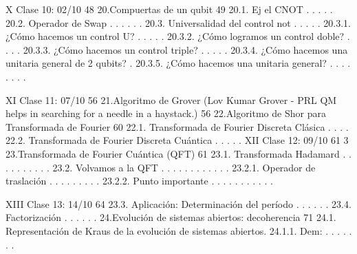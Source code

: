X Clase 10: 02/10 48
20.Compuertas de un qubit 49
20.1. Ej el CNOT . . . . .
20.2. Operador de Swap . . . . . .
20.3. Universalidad del control not . . . . .
20.3.1. ¿Cómo hacemos un control U? . . . . . 
20.3.2. ¿Cómo logramos un control doble? . . . . 
20.3.3. ¿Cómo hacemos un control triple? . . . . . 
20.3.4. ¿Cómo hacemos una unitaria general de 2 qubits? . 
20.3.5. ¿Cómo hacemos una unitaria general? . . . . . . . .

XI Clase 11: 07/10 56
21.Algoritmo de Grover (Lov Kumar Grover - PRL QM helps in searching for a needle in a haystack.) 56
22.Algoritmo de Shor para Transformada de Fourier 60
22.1. Transformada de Fourier Discreta Clásica . . . .
22.2. Transformada de Fourier Discreta Cuántica . . . . . 
XII Clase 12: 09/10 61
3
23.Transformada de Fourier Cuántica (QFT) 61
23.1. Transformada Hadamard . . . . . . . . . .
23.2. Volvamos a la QFT . . . . . . . . . . . .
23.2.1. Operador de traslación . . . . . . . . .
23.2.2. Punto importante . . . . . . . . . . . 

XIII Clase 13: 14/10 64
23.3. Aplicación: Determinación del período . . . . . . 
23.4. Factorización . . . . . .
24.Evolución de sistemas abiertos: decoherencia 71
24.1. Representación de Kraus de la evolución de sistemas abiertos.
24.1.1. Dem: . . . . . . . 